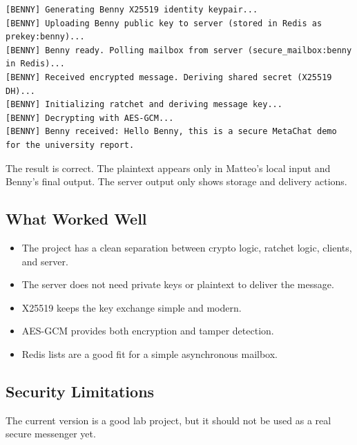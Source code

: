 \documentclass[12pt,a4paper]{article}
\begin{document}
\begin{lstlisting}[style=output, caption={Benny output}]
[BENNY] Generating Benny X25519 identity keypair...
[BENNY] Uploading Benny public key to server (stored in Redis as prekey:benny)...
[BENNY] Benny ready. Polling mailbox from server (secure_mailbox:benny in Redis)...
[BENNY] Received encrypted message. Deriving shared secret (X25519 DH)...
[BENNY] Initializing ratchet and deriving message key...
[BENNY] Decrypting with AES-GCM...
[BENNY] Benny received: Hello Benny, this is a secure MetaChat demo for the university report.
\end{lstlisting}

The result is correct. The plaintext appears only in Matteo's local input and Benny's final output. The server output only shows storage and delivery actions.

\subsection{What Worked Well}

\begin{itemize}
    \item The project has a clean separation between crypto logic, ratchet logic, clients, and server.
    \item The server does not need private keys or plaintext to deliver the message.
    \item X25519 keeps the key exchange simple and modern.
    \item AES-GCM provides both encryption and tamper detection.
    \item Redis lists are a good fit for a simple asynchronous mailbox.
\end{itemize}

\subsection{Security Limitations}

The current version is a good lab project, but it should not be used as a real secure messenger yet.
\end{document}
